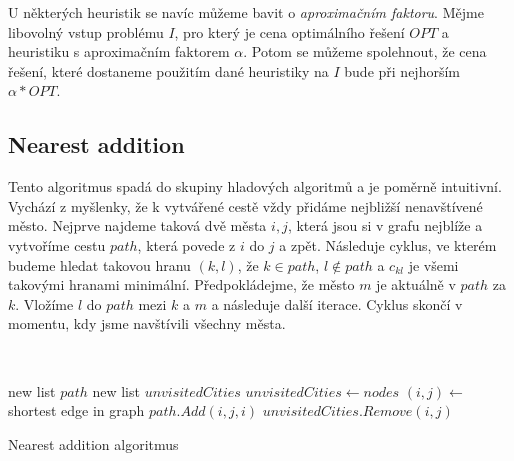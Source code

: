 \documentclass[
  biblatex,
  figures=false,
  glossaries,
  index
]{kidiplom}
\begin{document}
U některých heuristik se navíc můžeme bavit o \textit{aproximačním faktoru}. Mějme libovolný vstup problému $I$, pro který je cena optimálního řešení $OPT$ a heuristiku s aproximačním faktorem $\alpha$. Potom se můžeme spolehnout, že cena řešení, které dostaneme použitím dané heuristiky na $I$ bude při nejhorším $\alpha * OPT$.

\subsection{Nearest addition}
	Tento algoritmus spadá do skupiny hladových algoritmů a je poměrně intuitivní. Vychází z myšlenky, že k vytvářené cestě vždy přidáme nejbližší nenavštívené město. Nejprve najdeme taková dvě města $i, j$, která jsou si v grafu nejblíže a vytvoříme cestu $path$, která povede z $i$ do $j$ a zpět. Následuje cyklus, ve kterém budeme hledat takovou hranu $(k, l)$, že $k \in path$, $l \notin path$ a $c_{kl}$ je všemi takovými hranami minimální. Předpokládejme, že město $m$ je aktuálně v $path$ za $k$. Vložíme $l$ do $path$ mezi $k$ a $m$ a následuje další iterace. Cyklus skončí v momentu, kdy jsme navštívili všechny města.\newline
	
{\SetAlgoNoLine\
\begin{algorithm}[H]
new list $path$\;
new list $unvisitedCities$\;
$unvisitedCities \leftarrow nodes$\;
$(i, j) \leftarrow $ shortest edge in graph\;
$path.Add(i, j, i)$\;
$unvisitedCities.Remove(i, j)$\;

\caption{Nearest addition algoritmus}
\end{algorithm}}\leavevmode\newline
\end{document}
